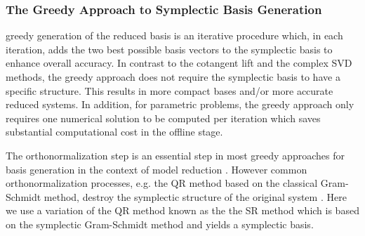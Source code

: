 \subsubsection{The Greedy Approach to Symplectic Basis Generation} \label{Chap:Symo.PrSy:3} greedy generation of the reduced basis is an iterative procedure which, in each iteration, adds the two best possible basis vectors to the symplectic basis to enhance overall accuracy. In contrast to the cotangent lift and the complex SVD methods, the greedy approach does not require the symplectic basis to have a specific structure. This results in more compact bases and/or more accurate reduced systems. In addition, for parametric problems, the greedy approach only requires one numerical solution to be computed per iteration which saves substantial computational cost in the offline stage. 

{\edit The orthonormalization step is an essential step in most greedy approaches for basis generation in the context of model reduction \cite{Anonymous:2016wl,Quarteroni:2016wi}. However common orthonormalization processes, e.g. the QR method based on the classical Gram-Schmidt method, destroy the symplectic structure of the original system \cite{BunseGerstner:1986dg}. Here we use a variation of the QR method known as the the SR \cite{Salam2014} method which is based on the symplectic Gram-Schmidt method and yields a symplectic basis. 
}

